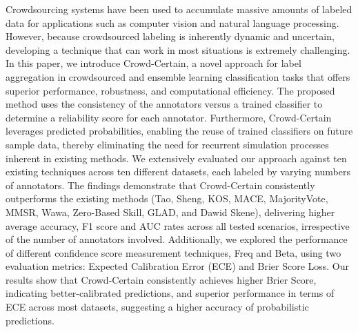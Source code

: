 Crowdsourcing systems have been used to accumulate massive amounts of labeled data for applications such as computer vision and natural language processing.
However, because crowdsourced labeling is inherently dynamic and uncertain, developing a technique that can work in most situations is extremely challenging.
In this paper, we introduce Crowd-Certain, a novel approach for label aggregation in crowdsourced and ensemble learning classification tasks that offers superior performance, robustness, and computational efficiency.
The proposed method uses the consistency of the annotators versus a trained classifier to determine a reliability score for each annotator.
Furthermore, Crowd-Certain leverages predicted probabilities, enabling the reuse of trained classifiers on future sample data, thereby eliminating the need for recurrent simulation processes inherent in existing methods.
We extensively evaluated our approach against ten existing techniques across ten different datasets, each labeled by varying numbers of annotators.
The findings demonstrate that Crowd-Certain consistently outperforms the existing methods (Tao, Sheng, KOS, MACE, MajorityVote, MMSR, Wawa, Zero-Based Skill, GLAD, and Dawid Skene), delivering higher average accuracy, F1 score and AUC rates across all tested scenarios, irrespective of the number of annotators involved.
Additionally, we explored the performance of different confidence score measurement techniques, Freq and Beta, using two evaluation metrics: Expected Calibration Error (ECE) and Brier Score Loss.
Our results show that Crowd-Certain consistently achieves higher Brier Score, indicating better-calibrated predictions, and superior performance in terms of ECE across most datasets, suggesting a higher accuracy of probabilistic predictions.

